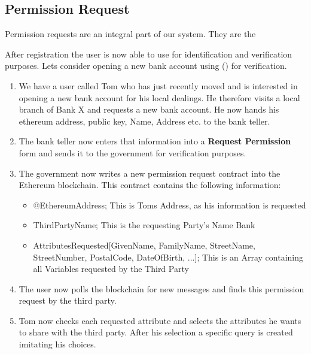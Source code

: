 \subsection{Permission Request}
Permission requests are an integral part of our system. They are the 


After registration the user is now able to use \projectName{} for identification and verification purposes. Lets consider opening a new bank account using \projectName() for verification.


\begin{enumerate}
\item \label{permission_request_item_one}
We have a user called Tom who has just recently moved and is interested in opening a new bank account for his local dealings. He therefore visits a local branch of Bank X and requests a new bank account. He now hands his ethereum address, public key, Name, Address etc. to the bank teller.
\item \label{permission_request_item_two}
The bank teller now enters that information into a \textbf{Request Permission} form and sends it to the government for verification purposes.
\item \label{permission_request_item_three}
The government now writes a new permission request contract into the Ethereum blockchain. This contract contains the following information:
\begin{itemize}
\item @EthereumAddress; This is Toms Address, as his information is requested
\item ThirdPartyName; This is the requesting Party's Name Bank 
\item AttributesRequested[GivenName, FamilyName, StreetName, StreetNumber, PostalCode, DateOfBirth, ...]; This is an Array containing all Variables requested by the Third Party
\end{itemize}
\item \label{permission_request_item_four}
The user now polls the blockchain for new messages and finds this permission request by the third party.
\item \label{permission_request_item_five}
Tom now checks each requested attribute and selects the attributes he wants to share with the third party. After his selection a specific query is created imitating his choices.
\end{enumerate}

